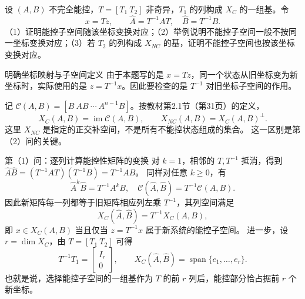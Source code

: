 \documentclass[11pt]{article}
\begin{document}
\begin{problem}[原题 20]
设 $(A,B)$ 不完全能控，$T=[T_1\ T_2]$ 非奇异，$T_1$ 的列构成 $X_C$ 的一组基。令
\[
x=Tz,\qquad \widehat A=T^{-1}AT,\quad\widehat B=T^{-1}B.
\]
（1）证明能控子空间随该坐标变换对应；（2）举例说明不能控子空间一般不按同一坐标变换对应；（3）若 $T_2$ 的列构成 $X_{NC}$ 的基，证明不能控子空间也按该坐标变换对应。
\end{problem}
\begin{solution}
\begin{proofstep}{明确坐标映射与子空间定义}
由于本题写的是 $x=Tz$，同一个状态从旧坐标变为新坐标时，实际使用的是
$z=T^{-1}x$。因此要检查的是 $T^{-1}$ 对旧坐标子空间的作用。

记 $\mathcal C(A,B)=[B\ AB\ \cdots\ A^{n-1}B]$。按教材第2.1节（第31页）的定义，
\[
X_C(A,B)=\operatorname{im}\mathcal C(A,B),\qquad
X_{NC}(A,B)=X_C(A,B)^\perp.
\]
这里 $X_{NC}$ 是指定的正交补空间，不是所有不能控状态组成的集合。
这一区别是第（2）问的关键。
\end{proofstep}

\begin{proofstep}{第（1）问：逐列计算能控性矩阵的变换}
对 $k=1$，相邻的 $T,T^{-1}$ 抵消，得到
$\widehat A\widehat B=(T^{-1}AT)(T^{-1}B)=T^{-1}AB$。
同样对任意 $k\ge0$，有
\[
\widehat A^k\widehat B=T^{-1}A^kB,
\quad \mathcal C(\widehat A,\widehat B)=T^{-1}\mathcal C(A,B).
\]
因此新矩阵每一列都等于旧矩阵相应列左乘 $T^{-1}$，其列空间满足
\[
\boxed{X_C(\widehat A,\widehat B)=T^{-1}X_C(A,B),}
\]
即 $x\in X_C(A,B)$ 当且仅当 $z=T^{-1}x$ 属于新系统的能控子空间。
进一步，设 $r=\dim X_C$，由 $T=[T_1\ T_2]$ 可得
\[
T^{-1}T_1=\begin{bmatrix}I_r\\0\end{bmatrix},\qquad
X_C(\widehat A,\widehat B)=\operatorname{span}\{e_1,\ldots,e_r\}.
\]
也就是说，选择能控子空间的一组基作为 $T$ 的前 $r$ 列后，能控部分恰占据前 $r$ 个新坐标。
\end{proofstep}


\end{solution}
\end{document}
